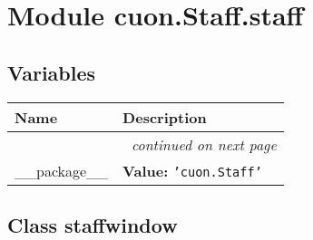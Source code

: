 %
%
%


\section{Module cuon.Staff.staff}

    \label{cuon:Staff:staff}


  \subsection{Variables}

    \vspace{-1cm}
\hspace{\varindent}\begin{longtable}{|p{\varnamewidth}|p{\vardescrwidth}|l}
\cline{1-2}
\cline{1-2} \centering \textbf{Name} & \centering \textbf{Description}& \\
\cline{1-2}
\endhead\cline{1-2}\multicolumn{3}{r}{\small\textit{continued on next page}}\\\endfoot\cline{1-2}
\endlastfoot\raggedright \_\-\_\-p\-a\-c\-k\-a\-g\-e\-\_\-\_\- & \raggedright \textbf{Value:} 
{\tt \texttt{'}\texttt{cuon.Staff}\texttt{'}}&\\
\cline{1-2}
\end{longtable}



\subsection{Class staffwindow}

